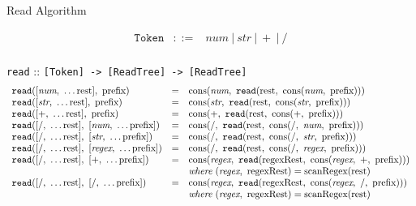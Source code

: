 \documentclass[preprint,10pt]{sigplanconf}
\begin{document}
\begin{displayfigure*}{\label{fig:read}Read Algorithm}
  
\[
\begin{array}{rcl}
  \texttt{Token} &::=& \textit{num}~|~\textit{str}~|~+~|~/ \\
\end{array}
\]

  \texttt{read} :: \verb![Token] -> [ReadTree] -> [ReadTree]!
\[
  \begin{array}{lcl}
    \texttt{read}([\textit{num},~\ldots \textrm{rest}],~\textrm{prefix})
    &=&
    \textrm{cons}(\textit{num},~
      \texttt{read}(\textrm{rest},~
        \textrm{cons}(\textit{num},~\textrm{prefix}) 
      )
    )
    \\
    \texttt{read}([\textit{str},~\ldots \textrm{rest}],~\textrm{prefix})
    &=&
    \textrm{cons}(\textit{str},~
      \texttt{read}(\textrm{rest},~
        \textrm{cons}(\textit{str},~\textrm{prefix})
      )  
    )
    
    
    \\
    \texttt{read}([+,~\ldots \textrm{rest}],~\textrm{prefix})
    &=&
    \textrm{cons}(+,~
      \texttt{read}(\textrm{rest},~
        \textrm{cons}(+,~\textrm{prefix})
      )
    ) 
    \\
    \texttt{read}([/,~\ldots \textrm{rest}],~[\textit{num},~\ldots\textrm{prefix}])
    &=&
    \textrm{cons}(/,~
      \texttt{read}(\textrm{rest},~
        \textrm{cons}(/,~\textit{num},~\textrm{prefix}) 
      )
    )
    \\
    \texttt{read}([/,~\ldots \textrm{rest}],~[\textit{str},~\ldots\textrm{prefix}])
    &=&
    \textrm{cons}(/,~
      \texttt{read}(\textrm{rest},~
        \textrm{cons}(/,~\textit{str},~\textrm{prefix}) 
      )
    )
    \\
    \texttt{read}([/,~\ldots \textrm{rest}],~[\textit{regex},~\ldots\textrm{prefix}])
    &=&
    \textrm{cons}(/,~
      \texttt{read}(\textrm{rest},~
        \textrm{cons}(/,~\textit{regex},~\textrm{prefix}) 
      )
    )
    \\
    \texttt{read}([/,~\ldots \textrm{rest}],~[+,~\ldots\textrm{prefix}])
    &=&
    \textrm{cons}(\textit{regex},~
      \texttt{read}(\textrm{regexRest},~
        \textrm{cons}(\textit{regex},~+,~\textrm{prefix}) 
      )
    )
    \\
    && \textit{where}~(\textit{regex},~\textrm{regexRest}) = 
    \textrm{scanRegex}(\textrm{rest})
    \\
    \texttt{read}([/,~\ldots \textrm{rest}],~[/,~\ldots\textrm{prefix}])
    &=&
    \textrm{cons}(\textit{regex},~
      \texttt{read}(\textrm{regexRest},~
        \textrm{cons}(\textit{regex},~/,~\textrm{prefix}) 
      )
    )
    \\
    && \textit{where}~(\textit{regex},~\textrm{regexRest}) = 
    \textrm{scanRegex}(\textrm{rest})
  \end{array}
\]
\end{displayfigure*}
\end{document}
